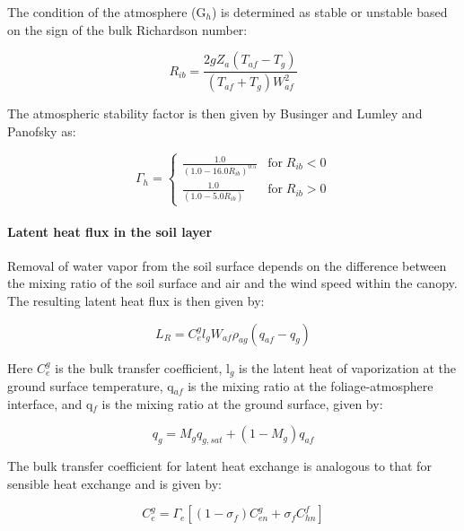 The condition of the atmosphere (G\(_{h}\)) is determined as stable or unstable based on the sign of the bulk Richardson number:

\begin{equation}
{R_{ib}} = \frac{{2g{Z_a}\left( {{T_{af}} - {T_g}} \right)}}{{\left( {{T_{af}} + {T_g}} \right)W_{af}^2}}
\end{equation}

The atmospheric stability factor is then given by Businger and Lumley and Panofsky as:

\begin{equation}
\Gamma_h = \left\{
    \begin{array}{cl}
      \frac{1.0}{\left( 1.0 - 16.0 R_{ib} \right)^{0.5}} & \text{for} \; R_{ib} < 0 \\
      \frac{1.0}{\left( 1.0 - 5.0  R_{ib} \right)      } & \text{for} \; R_{ib} > 0
    \end{array}
  \right.
\end{equation}

\paragraph{Latent heat flux in the soil layer}\label{latent-heat-flux-in-the-soil-layer}

Removal of water vapor from the soil surface depends on the difference between the mixing ratio of the soil surface and air and the wind speed within the canopy. The resulting latent heat flux is then given by:

\begin{equation}
{L_R} = C_e^g{l_g}{W_{af}}{\rho_{ag}}\left( {{q_{af}} - {q_g}} \right)
\end{equation}

Here \(C_e^g\) is the bulk transfer coefficient, l\(_{g}\) is the latent heat of vaporization at the ground surface temperature, q\(_{af}\) is the mixing ratio at the foliage-atmosphere interface, and q\(_{f}\) is the mixing ratio at the ground surface, given by:

\begin{equation}
{q_g} = {M_g}{q_{g,sat}} + \left( {1 - {M_g}} \right){q_{af}}
\end{equation}

The bulk transfer coefficient for latent heat exchange is analogous to that for sensible heat exchange and is given by:

\begin{equation}
C_e^g = {\Gamma_e}\left[ {\left( {1 - {\sigma_f}} \right)C_{en}^g + {\sigma_f}C_{hn}^f} \right]
\end{equation}

